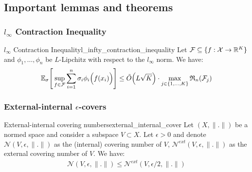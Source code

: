 \subsection{Important lemmas and theorems}
\subsubsection{$l_\infty$ Contraction Inequality}
\begin{theorem}{$l_\infty$ Contraction Inequality}{l_infty_contraction_inequality}
    Let $\mathcal{F}\subseteq\{f:\mathcal{X} \to \mathbb{R}^K\}$ and $\phi_1, \dots, \phi_n$ be $L$-Lipchitz with respect to the $l_\infty$ norm. We have:
    \begin{align*}
        \mathbb{E}_\sigma\Bigg[ 
            \sup_{f\in\mathcal{F}}\sum_{i=1}^n \sigma_i\phi_i\Big( f(x_i) \Big) 
         \Bigg]\le \tilde O\Big( L\sqrt K \Big)\cdot\max_{j\in\{1, \dots, K\}} \mathfrak{R}_n(\mathcal{F}_j)
    \end{align*}
\end{theorem}

\begin{proof*}
    
\end{proof*}


\subsubsection{External-internal $\epsilon$-covers}
\begin{lemma}{External-internal covering numbers}{external_internal_cover}
    Let $(X, \|.\|)$ be a normed space and consider a subspace $V\subset X$. Let $\epsilon > 0$ and denote $\mathcal{N}(V, \epsilon, \|.\|)$ as the (internal) covering number of $V$, $\mathcal{N}^{ext}(V, \epsilon, \|.\|)$ as the external covering number of $V$. We have:
    \begin{align*}
        \mathcal{N}(V, \epsilon, \|.\|) \le \mathcal{N}^{ext}(V, \epsilon/2, \|.\|)
    \end{align*} 
\end{lemma}

\begin{proof*}
    
\end{proof*}

